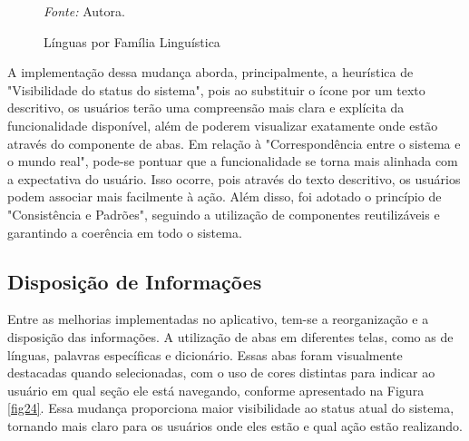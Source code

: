\begin{figure}[h!]
	\centering
	\caption{Línguas por Família Linguística}
	\begin{tablenotes}[flushleft]
		\centering
		\item \textit{Fonte:} Autora.
	\end{tablenotes}
	\label{fig23}
\end{figure}

A implementação dessa mudança aborda, principalmente, a heurística de "Visibilidade do status do sistema", pois ao substituir o ícone por um texto descritivo, os usuários terão uma compreensão mais clara e explícita da 
funcionalidade disponível, além de poderem visualizar exatamente onde estão através do componente de abas. Em relação à "Correspondência entre o sistema e o mundo real", pode-se pontuar que a funcionalidade se torna mais 
alinhada com a expectativa do usuário. Isso ocorre, pois através do texto descritivo, os usuários podem associar mais facilmente à ação. Além disso, foi adotado o princípio de "Consistência e Padrões", seguindo a utilização de componentes 
reutilizáveis e garantindo a coerência em todo o sistema. 

\subsection{Disposição de Informações}
\label{sec:Disposicao de Informacoes}

Entre as melhorias implementadas no aplicativo, tem-se a reorganização e a disposição das informações. A utilização de abas em diferentes telas, como as de línguas, palavras específicas e dicionário. Essas abas foram 
visualmente destacadas quando selecionadas, com o uso de cores distintas para indicar ao usuário em qual seção ele está navegando, conforme apresentado na Figura \ref*{fig24}. Essa mudança proporciona maior visibilidade ao status atual do sistema, tornando mais 
claro para os usuários onde eles estão e qual ação estão realizando.

